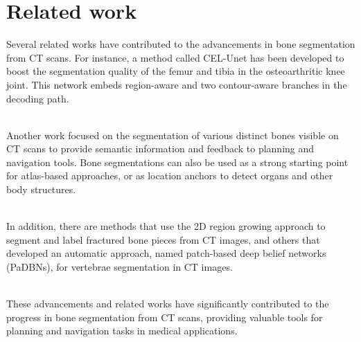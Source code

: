 \documentclass[conference]{IEEEtran}
\begin{document}
\section{Related work}
Several related works have contributed to the advancements in bone segmentation from CT scans. For instance, a method called CEL-Unet has been developed to boost the segmentation quality of the femur and tibia in the osteoarthritic knee joint. This network embeds region-aware and two contour-aware branches in the decoding path.

\\Another work focused on the segmentation of various distinct bones visible on CT scans to provide semantic information and feedback to planning and navigation tools. Bone segmentations can also be used as a strong starting point for atlas-based approaches, or as location anchors to detect organs and other body structures.

\\In addition, there are methods that use the 2D region growing approach to segment and label fractured bone pieces from CT images, and others that developed an automatic approach, named patch-based deep belief networks (PaDBNs), for vertebrae segmentation in CT images.

\\These advancements and related works have significantly contributed to the progress in bone segmentation from CT scans, providing valuable tools for planning and navigation tasks in medical applications.
\end{document}
